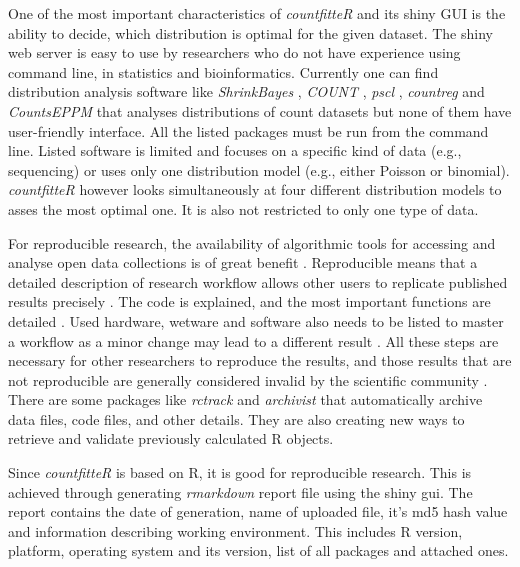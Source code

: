 One of the most important characteristics of \emph{countfitteR} and its shiny GUI is the ability to decide, which distribution is optimal for the given dataset. The shiny web server is easy to use by researchers who do not have experience using command line, in statistics and bioinformatics. 
Currently one can find distribution analysis software like \emph{ShrinkBayes} \citep{shrinkbayes}, \emph{COUNT} \citep{COUNT}, \emph{pscl} \citep{pscl}, \emph{countreg} \citep{countreg} and \emph{CountsEPPM} \citep{countseppm} that analyses distributions of count datasets but none of them have user-friendly interface. All the listed packages must be run from the command line. 
Listed software is limited and focuses on a specific kind of data (e.g., sequencing) or uses only one distribution model (e.g., either Poisson or binomial). \emph{countfitteR} however looks simultaneously at four different distribution models to asses the most optimal one. It is also not restricted to only one type of data. 

For reproducible research, the availability of algorithmic tools for accessing and analyse open data collections is of great benefit \cite{lahti_retrieval_2017}. Reproducible means that a detailed description of research workflow allows other users to replicate published results precisely \citep{leeper_archiving_2014}. The code is explained, and the most important functions are detailed \citep{thioulouse_online_2010}. 
Used hardware, wetware and software also needs to be listed to master a workflow as a minor change may lead to a different result \citep{rodiger_r_2015}. 
All these steps are necessary for other researchers to reproduce the results, and those results that are not reproducible are generally considered invalid by the scientific community \citep{rodiger_r_2015}.
There are some packages like \emph{rctrack} \citep{liu_r_2014} and \emph{archivist} \citep{Biecek_2017} that automatically archive data files, code files, and other details. They are also creating new ways to retrieve and validate previously calculated R objects. 

Since \emph{countfitteR} is based on R, it is good for reproducible research. This is achieved through generating \emph{rmarkdown} \citep{rmarkdown} report file using the shiny gui. The report contains the date of generation, name of uploaded file, it's md5 hash value and information describing working environment. This includes R version, platform, operating system and its version, list of all packages and attached ones.

